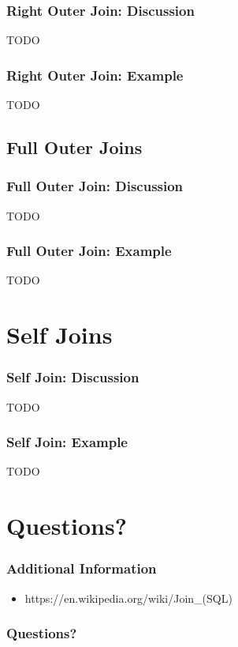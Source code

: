 \documentclass{beamer}
\begin{document}
\begin{frame}
  \frametitle{Right Outer Join: Discussion}
  TODO
\end{frame}

\begin{frame}
  \frametitle{Right Outer Join: Example}
  TODO
\end{frame}




\subsection{Full Outer Joins} %

\begin{frame}
  \frametitle{Full Outer Join: Discussion}
  TODO
\end{frame}

\begin{frame}
  \frametitle{Full Outer Join: Example}
  TODO
\end{frame}


\section{Self Joins} %

\begin{frame}
  \frametitle{Self Join: Discussion}
  TODO
\end{frame}

\begin{frame}
  \frametitle{Self Join: Example}
  TODO
\end{frame}



\section{Questions?} %

\begin{frame}
  \frametitle{Additional Information}
  \begin{itemize}
  \item https://en.wikipedia.org/wiki/Join\_(SQL)
  \end{itemize}
\end{frame}

\begin{frame}
 \frametitle{Questions?}

\end{frame}
\end{document}
